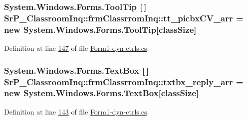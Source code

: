 \hypertarget{class_sr_p___classroom_inq_1_1frm_classrrom_inq_a2b443a71216ac1b9a63f9db496161a4d}{
\subsubsection[{tt\-\_\-picbx\-C\-V\-\_\-arr}]{\setlength{\rightskip}{0pt plus 5cm}\-System.\-Windows.\-Forms.\-Tool\-Tip \mbox{[}$\,$\mbox{]} {\bf \-Sr\-P\-\_\-\-Classroom\-Inq\-::frm\-Classrrom\-Inq\-::tt\-\_\-picbx\-C\-V\-\_\-arr} = new \-System.\-Windows.\-Forms.\-Tool\-Tip\mbox{[}{\bf class\-Size}\mbox{]}}}
\label{class_sr_p___classroom_inq_1_1frm_classrrom_inq_a2b443a71216ac1b9a63f9db496161a4d}


\-Definition at line \hyperlink{_form1-dyn-ctrls_8cs_source_l00147}{147} of file \hyperlink{_form1-dyn-ctrls_8cs_source}{\-Form1-\/dyn-\/ctrls.\-cs}.

\hypertarget{class_sr_p___classroom_inq_1_1frm_classrrom_inq_a3411157caafbe33c31a364fafd548afb}{
\subsubsection[{txtbx\-\_\-reply\-\_\-arr}]{\setlength{\rightskip}{0pt plus 5cm}\-System.\-Windows.\-Forms.\-Text\-Box \mbox{[}$\,$\mbox{]} {\bf \-Sr\-P\-\_\-\-Classroom\-Inq\-::frm\-Classrrom\-Inq\-::txtbx\-\_\-reply\-\_\-arr} = new \-System.\-Windows.\-Forms.\-Text\-Box\mbox{[}{\bf class\-Size}\mbox{]}}}
\label{class_sr_p___classroom_inq_1_1frm_classrrom_inq_a3411157caafbe33c31a364fafd548afb}


\-Definition at line \hyperlink{_form1-dyn-ctrls_8cs_source_l00143}{143} of file \hyperlink{_form1-dyn-ctrls_8cs_source}{\-Form1-\/dyn-\/ctrls.\-cs}.

